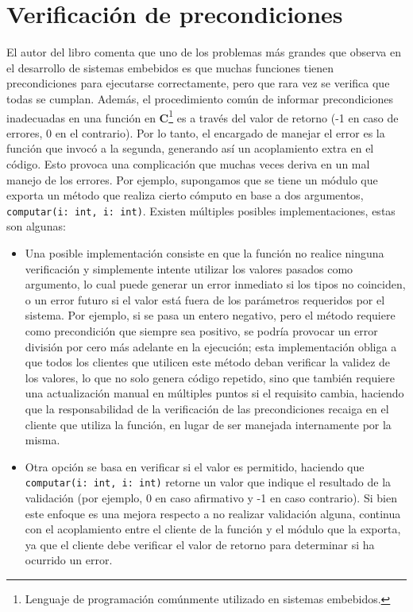 \section{Verificación de precondiciones}
El autor del libro \cite{douglass} comenta que uno de los problemas más grandes que observa en el desarrollo de sistemas embebidos es que muchas funciones tienen precondiciones para ejecutarse correctamente, pero que rara vez se verifica que todas se cumplan. Además, el procedimiento común de informar precondiciones inadecuadas en una función en \textbf{C}\footnote{Lenguaje de programación comúnmente utilizado en sistemas embebidos.} es a través del valor de retorno (-1 en caso de errores, 0 en el contrario). Por lo tanto, el encargado de manejar el error es la función que invocó a la segunda, generando así un acoplamiento extra en el código. Esto provoca una complicación que muchas veces deriva en un mal manejo de los errores. Por ejemplo, supongamos que se tiene un módulo que exporta un método que realiza cierto cómputo en base a dos argumentos, \verb|computar(i: int, i: int)|. Existen múltiples posibles implementaciones, estas son algunas:
\begin{itemize}
    \item Una posible implementación consiste en que la función no realice ninguna verificación y simplemente intente utilizar los valores pasados como argumento, lo cual puede generar un error inmediato si los tipos no coinciden, o un error futuro si el valor está fuera de los parámetros requeridos por el sistema. Por ejemplo, si se pasa un entero negativo, pero el método requiere como precondición que siempre sea positivo, se podría provocar un error división por cero más adelante en la ejecución; esta implementación obliga a que todos los clientes que utilicen este método deban verificar la validez de los valores, lo que no solo genera código repetido, sino que también requiere una actualización manual en múltiples puntos si el requisito cambia, haciendo que la responsabilidad de la verificación de las precondiciones recaiga en el cliente que utiliza la función, en lugar de ser manejada internamente por la misma.
    \item Otra opción se basa en verificar si el valor es permitido, haciendo que \\ \verb|computar(i: int, i: int)| retorne un valor que indique el resultado de la validación (por ejemplo, 0 en caso afirmativo y -1 en caso contrario). Si bien este enfoque es una mejora respecto a no realizar validación alguna, continua con el acoplamiento entre el cliente de la función y el módulo que la exporta, ya que el cliente debe verificar el valor de retorno para determinar si ha ocurrido un error.
\end{itemize}

